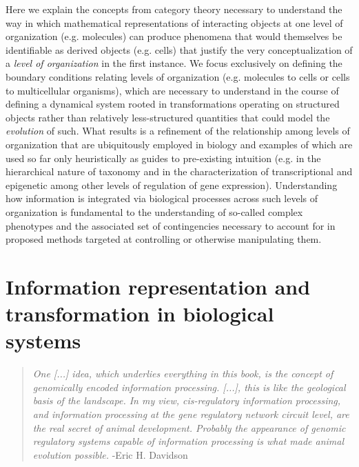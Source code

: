 \documentclass[aps,twocolumn]{revtex4-1}
\begin{document}
Here we explain the concepts from category theory necessary to understand the way in which mathematical representations of interacting objects at one level of organization (e.g. molecules) can produce phenomena that would themselves be identifiable as derived objects (e.g. cells) that justify the very conceptualization of a \emph{level of organization} in the first instance. We focus exclusively on defining the boundary conditions relating levels of organization (e.g. molecules to cells or cells to multicellular organisms), which are necessary to understand in the course of defining a dynamical system rooted in transformations operating on structured objects rather than relatively less-structured quantities that could model the \emph{evolution} of such. What results is a refinement of the relationship among levels of organization that are ubiquitously employed in biology and examples of which are used so far only heuristically as guides to pre-existing intuition (e.g. in the hierarchical nature of taxonomy and in the characterization of transcriptional and epigenetic among other levels of regulation of gene expression). Understanding how information is integrated via biological processes across such levels of organization is fundamental to the understanding of so-called complex phenotypes and the associated set of contingencies necessary to account for in proposed methods targeted at controlling or otherwise manipulating them.

\section{Information representation and transformation in biological systems}

\begin{quotation}
{\it One [...] idea, which underlies everything in this book, is the concept
of genomically encoded information processing. [...],
this is like the geological basis of the landscape. In my view, cis-regulatory information processing, and information processing at the gene regulatory network circuit level, are the real secret of animal development. Probably the appearance of genomic regulatory systems capable of information processing is what made animal evolution possible.} -Eric H. Davidson \cite{Davidson2006a}
\end{quotation}
\end{document}
